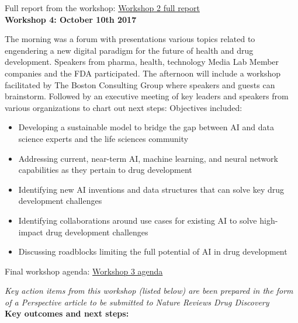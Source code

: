 Full report from the workshop: \href{https://drive.google.com/file/d/1l1dgWlCuBms-LWHdrP6-4qDdLJs83fkq/view?usp=sharing}{Workshop 2 full report} \\

\textbf{Workshop 4: October 10th 2017}

The morning was a forum with presentations various topics related to engendering a new digital paradigm for the future of health and drug development. Speakers from pharma, health, technology Media Lab Member companies and the FDA participated. The afternoon will include a workshop facilitated by The Boston Consulting Group where speakers and guests can brainstorm. Followed by an executive meeting of key leaders and speakers from various organizations to chart out next steps:
Objectives included:
\begin{itemize}
\item Developing a sustainable model to bridge the gap between AI and data science experts and the life sciences community
\item Addressing current, near-term AI, machine learning, and neural network capabilities as they pertain to drug development
\item Identifying new AI inventions and data structures that can solve key drug development challenges
\item Identifying collaborations around use cases for existing AI to solve high-impact drug development challenges
\item Discussing roadblocks limiting the full potential of AI in drug development
\end{itemize}

Final workshop agenda: \href{https://www.media.mit.edu/events/artificial-intelligence-in-clinical-development-to-improve-public-health/}{Workshop 3 agenda}

\textit{Key action items from this workshop (listed below) are been prepared in the form of a Perspective article to be submitted to Nature Reviews Drug Discovery} \\

\textbf{Key outcomes and next steps:}

